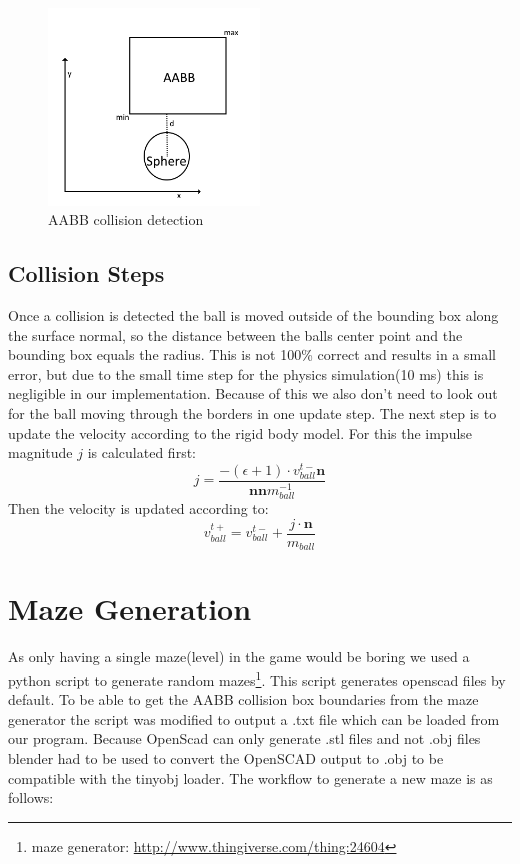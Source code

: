 \documentclass[11pt,a4paper]{article}
\begin{document}
\begin{figure}[H]
\centering
\includegraphics[width=0.5\textwidth]{images/AABB}
\caption{AABB collision detection}
\label{fig:AABB}
\end{figure}


\subsection{Collision Steps}
\label{subsec:collisionSteps}

Once a collision is detected the ball is moved outside of the bounding box along the surface normal, so the distance between the balls center point and the bounding box equals the radius. This is not 100\% correct and results in a small error, but due to the small time step for the physics simulation(10 ms) this is negligible in our implementation. Because of this we also don't need to look out for the ball moving through the borders in one update step.
The next step is to update the velocity according to the rigid body model.
For this the impulse magnitude $j$ is calculated first:
$$j=\frac{-(\epsilon+1)\cdot v_{ball}^{t-}\boldsymbol{n}}{\boldsymbol{nn}m_{ball}^{-1}}$$
Then the velocity is updated according to:
$$v_{ball}^{t+} = v_{ball}^{t-}+ \frac{j \cdot \boldsymbol{n} }{m_{ball}}  $$

\newpage
\section{Maze Generation}
\label{sec:mazeGeneration}
As only having a single maze(level) in the game would be boring we used a python script to generate random mazes\footnote{maze generator: \url{http://www.thingiverse.com/thing:24604}}.
This script generates openscad files by default. To be able to get the AABB collision box boundaries from the maze generator the script was modified to output a .txt file which can be loaded from our program. Because OpenScad can only generate .stl files and not .obj files blender had to be used to convert the OpenSCAD output to .obj to be compatible with the tinyobj loader. The workflow to generate a new maze is as follows: 
\end{document}
